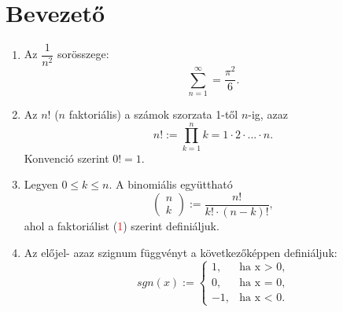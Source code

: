 \documentclass{article}
\begin{document}
\section{Bevezető}
\begin{enumerate}[label=\alph*)]
\item Az $\dfrac{1}{n^2}$ sorösszege:
\begin{equation}
\sum_{n=1}^{\infty} = \dfrac{\pi^2}{6}.
\end{equation}
\item Az $n!$ ($n$ faktoriális) a számok szorzata 1-től $n$-ig, azaz
\begin{equation}
n! := \prod_{k=1}^n k = 1\cdot 2 \cdot ... \cdot n.
\end{equation}
Konvenció szerint $0! = 1.$
\item Legyen $0 \leq k \leq n$. A binomiális együttható
\begin{equation}
\begin{pmatrix}
n \\
k
\end{pmatrix}
:= \dfrac{n!}{k! \cdot (n-k)!}, 
\end{equation}
ahol a faktoriálist (\textcolor{red}{1}) szerint definiáljuk.

\item Az előjel- azaz szignum függvényt a következőképpen definiáljuk:
\begin{equation}
sgn(x) := 
\begin{cases}
1, & \text{ha x > 0,} \\
0, & \text{ha x = 0,} \\
-1, & \text{ha x < 0.}
\end{cases}
\end{equation}
\end{enumerate}
\newpage
\end{document}
